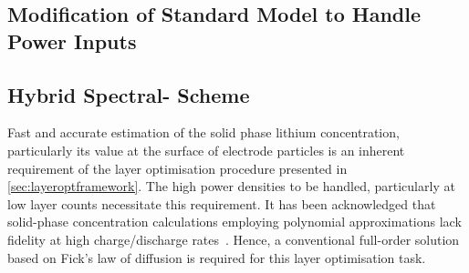 

\subsection{Modification of Standard  Model to Handle Power Inputs}\label{sec:innatepowerinput}


\subsection{Hybrid Spectral- Scheme}\label{sec:hybridfv-spectral}

Fast  and  accurate  estimation  of   the  solid  phase  lithium  concentration,
particularly  its   value  at   the  surface  of   electrode  particles   is  an
inherent  requirement   of  the   layer  optimisation  procedure   presented  in
\cref{sec:layeroptframework}.   The  high   power  densities   to  be   handled,
particularly  at  low   layer  counts  necessitate  this   requirement.  It  has
been   acknowledged  that   solid-phase  concentration   calculations  employing
polynomial    approximations   lack    fidelity    at   high    charge/discharge
rates~\cite{Santhanagopalan2006}.  Hence,  a  conventional  full-order  solution
based on Fick's law of diffusion is required for this layer optimisation task.

